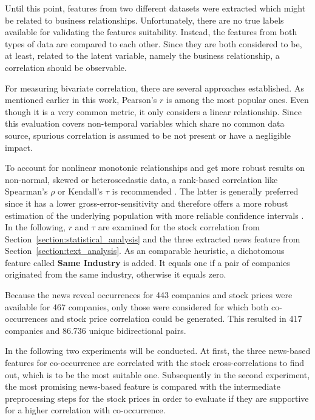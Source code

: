 Until this point, features from two different datasets were extracted which might be related to business relationships. Unfortunately, there are no true labels available for validating the features suitability. Instead, the features from both types of data are compared to each other. Since they are both considered to be, at least, related to the latent variable, namely the business relationship, a correlation should be observable.

For measuring bivariate correlation, there are several approaches established. As mentioned earlier in this work, Pearson's $r$ is among the most popular ones. Even though it is a very common metric, it only considers a linear relationship. Since this evaluation covers non-temporal variables which share no common data source, spurious correlation is assumed to be not present or have a negligible impact.

To account for nonlinear monotonic relationships and get more robust results on non-normal, skewed or heteroscedastic data, a rank-based correlation like Spearman's $\rho$ or Kendall's $\tau$ is recommended \cite{Kowalski1972OnCoefficient}. The latter is generally preferred since it has a lower gross-error-sensitivity \cite{Croux2010InfluenceMeasures} and therefore offers a more robust estimation of the underlying population with more reliable confidence intervals \cite{Newson2002ParametersDifferences}. In the following, $r$ and $\tau$ are examined for the stock correlation from Section~\ref{section:statistical_analysis} and the three extracted news feature from Section~\ref{section:text_analysis}. As an comparable heuristic, a dichotomous feature called \textbf{Same Industry} is added. It equals one if a pair of companies originated from the same industry, otherwise it equals zero.

Because the news reveal occurrences for 443 companies and stock prices were available for 467 companies, only those were considered for which both co-occurrences and stock price correlation could be generated. This resulted in 417 companies and 86.736 unique bidirectional pairs.

In the following two experiments will be conducted. At first, the three news-based features for co-occurrence are correlated with the stock cross-correlations to find out, which is to be the most suitable one. Subsequently in the second experiment, the most promising news-based feature is compared with the intermediate preprocessing steps for the stock prices in order to evaluate if they are supportive for a higher correlation with co-occurrence.


